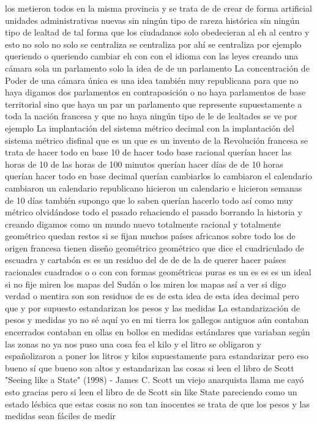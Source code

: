 los metieron todos en la misma provincia y se trata de de crear de forma artificial unidades administrativas nuevas
sin ningún tipo de rareza histórica sin ningún tipo de lealtad de tal forma que los
ciudadanos solo obedecieran al eh al centro
y esto no solo no solo se centraliza se centraliza por ahí se centraliza por ejemplo
queriendo o queriendo cambiar eh con con el idioma
con las leyes creando una cámara sola un parlamento solo la idea de de un parlamento
La concentración de Poder
de una cámara única es una idea también muy republicana para que no haya digamos dos parlamentos en contraposición
o no haya parlamentos de base territorial sino que haya un par un parlamento que represente supuestamente
a toda la nación francesa y que no haya ningún tipo de le de lealtades se ve por ejemplo
La implantación del sistema métrico decimal
con la implantación del sistema métrico disfinal que es un que es un invento de la Revolución francesa se trata de hacer todo en base 10
de hacer todo base racional querían hacer las horas de 10 de las horas de 100 minutos querían hacer días de de 10 horas
querían hacer todo en base decimal querían cambiarlos lo cambiaron el calendario
cambiaron un calendario republicano hicieron un calendario e hicieron semanas de 10 días también supongo que lo saben querían hacerlo todo así como muy métrico
olvidándose todo el pasado rehaciendo el pasado borrando la historia y creando digamos como un mundo nuevo totalmente racional y totalmente geométrico
quedan restos si se fijan muchos países africanos sobre todo los de origen francesa tienen diseño geométrico
geométrico que dice el cuadriculado de escuadra y cartabón es es un residuo del de de de la de querer hacer países racionales
cuadrados o o con con formas geométricas puras es un es es es un ideal si no fije
miren los mapas del Sudán o los miren los mapas así a ver si digo verdad o mentira son son residuos de es de esta idea
de esta idea decimal pero que y por supuesto estandarizan los pesos y las medidas
La estandarización de pesos y medidas
yo no sé aquí yo en mi tierra los gallegos antiguos aún contaban encerrados
contaban en ollas en bollos en medidas estándares que variaban según las zonas no
ya nos puso una cosa fea el kilo y el litro
se obligaron y españolizaron a poner los litros y kilos supuestamente para estandarizar
pero eso bueno sí que bueno son altos y estandarizan las cosas si leen el libro de Scott
"Seeing like a State" (1998) - James C. Scott
un viejo anarquista llama me cayó esto
gracias pero si leen el libro de de Scott sin like State
pareciendo como un estado lésbica que estas cosas no son tan inocentes se trata de que los pesos y las medidas sean fáciles de medir
